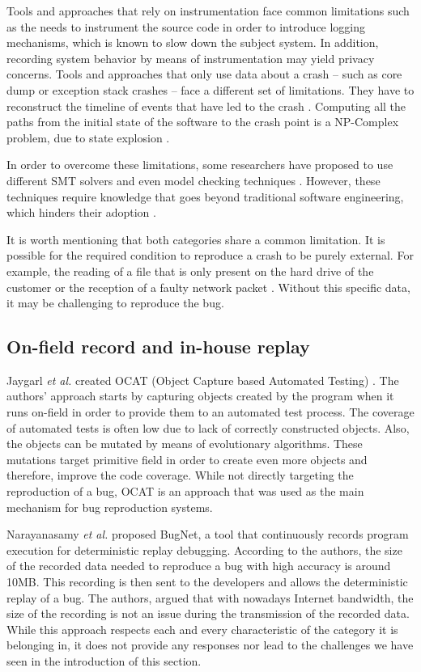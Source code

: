 \documentclass[times]{smrauth}
\begin{document}
Tools and approaches that rely on instrumentation face common limitations such as the needs to instrument the source code in order to introduce logging mechanisms\cite{Narayanasamy2005,Jaygarl,Artzi2008}, which is known to slow down the subject system. 
In addition,  recording system behavior by means of instrumentation may yield privacy concerns. 
Tools and approaches that only use data about a crash -- such as core dump or exception stack crashes -- face a different set of limitations. They have to reconstruct the timeline of events that have led to the crash \cite{Chen2013a,Nayrolles2015}. Computing all the paths from the initial state of the software to the crash point is a NP-Complex problem, due to state explosion \cite{Chen2013a,Clause2007}.

In order to overcome these limitations, some researchers have proposed to use different SMT solvers \cite{Dutertre2006} and even model checking techniques \cite{Visser2003}. 
However, these techniques require knowledge that goes beyond traditional software engineering, which hinders their adoption  \cite{Visser2004}.

It is worth mentioning that both categories share a common limitation. It is possible for the required condition to reproduce a crash to be purely external. For example, the reading of a file that is only present on the hard drive of the customer or the reception of a faulty network packet \cite{Chen2013a, Nayrolles2015}. Without this specific data, it may be challenging to reproduce the bug.



\subsection{On-field record and in-house replay}

Jaygarl {\it et al.} created OCAT (Object Capture based Automated Testing) \cite{Jaygarl}. The authors' approach starts by capturing objects created by the program when it runs on-field in order to provide them to an automated test process. The coverage of automated tests is often low due to lack of correctly constructed objects. Also, the objects can be mutated by means of evolutionary algorithms. These mutations target primitive field in order to create even more objects and therefore, improve the code coverage. While not directly targeting the reproduction of a bug, OCAT is an approach that was used as the main mechanism for bug reproduction systems.

Narayanasamy {\it et al.} \cite{Narayanasamy2005} proposed BugNet, a tool that continuously records program execution for deterministic replay debugging. According to the authors, the size of the recorded data needed to reproduce a bug with high accuracy is around 10MB. This recording is then sent to the developers and allows the deterministic replay of a bug. The authors, argued that with nowadays Internet bandwidth, the size of the recording is not an issue during the transmission of the recorded data. While this approach respects each and every characteristic of the category it is belonging in, it does not provide any responses nor lead to the challenges we have seen in the introduction of this section.
\end{document}

